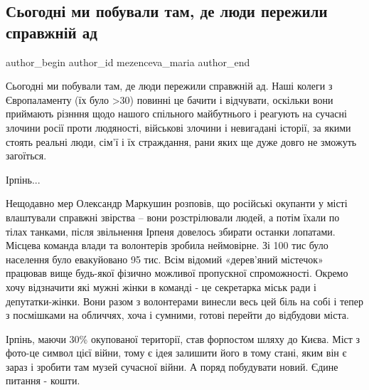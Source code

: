  
 
 
 
 
 
\subsection{Сьогодні ми побували там, де люди пережили справжній ад}
\label{sec:08_04_2022.fb.mezenceva_maria.1.ad}
 
\ifcmt
 author_begin
   author_id mezenceva_maria
 author_end
\fi

Сьогодні ми побували там, де люди пережили справжній ад. Наші колеги з
Європаламенту (їх було >30) повинні це бачити і відчувати, оскільки вони
приймають різнння щодо нашого спільного майбутнього і реагують на сучасні
злочини росії проти людяності, військові злочини і невигадані історії, за якими
стоять реальні люди, сім'ї і їх страждання, рани яких ще дуже довго не зможуть
загоїться. 

Ірпінь...

Нещодавно мер Олександр Маркушин розповів, що російські окупанти у місті влаштували справжні звірства – вони розстрілювали людей, а потім їхали по тілах танками, після звільнення Ірпеня довелось збирати останки лопатами. Місцева команда влади та волонтерів зробила неймовірне. Зі 100 тис було населення було евакуйовано 95 тис. Всім відомий «дерев'яний містечок» працював вище будь-якої фізично можливої пропускної спроможності. Окремо хочу відзначити які мужні жінки в команді - це секретарка міськ ради і депутатки-жінки. Вони разом з волонтерами винесли весь цей біль на собі і тепер з посмішками на обличчях, хоча і сумними, готові перейти до відбудови міста.


Ірпінь, маючи 30\% окупованої території, став форпостом шляху до Києва. Міст з
фото-це символ цієї війни, тому є ідея залишити його в тому стані, яким він є
зараз і зробити там музей сучасної війни. А поряд побудувати новий. Єдине
питання - кошти. 

